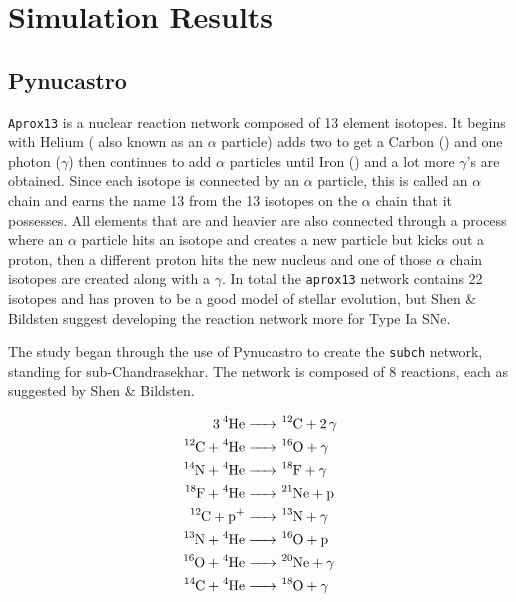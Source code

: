 \documentclass[11pt, oneside]{article}   	%
\begin{document}
\section{Simulation Results}

  \subsection{Pynucastro}
    
    {\tt Aprox13} is a nuclear reaction network composed of 13 element isotopes. It begins with Helium ( also known as an $\alpha$ particle) adds two  to get a Carbon () and one photon ($\gamma$) then continues to add $\alpha$ particles until Iron () and a lot more $\gamma$'s are obtained. Since each isotope is connected by an $\alpha$ particle, this is called an $\alpha$ chain and earns the name 13 from the 13 isotopes on the $\alpha$ chain that it possesses. All elements that are  and heavier are also connected through a process where an $\alpha$ particle hits an isotope and creates a new particle but kicks out a proton, then a different proton hits the new nucleus and one of those $\alpha$ chain isotopes are created along with a $\gamma$. In total the {\tt aprox13} network contains 22 isotopes and has proven to be a good model of stellar evolution, but Shen \& Bildsten suggest developing the reaction network more for Type Ia SNe. %
    
    The study began through the use of Pynucastro to create the {\tt subch} network, standing for sub-Chandrasekhar. The network is composed of 8 reactions, each as suggested by Shen \& Bildsten. %
    
    \begin{align}
            \ce{3 ^4He &->  ^{12}C + 2\gamma } \\ 
            \ce{^{12}C + ^4He &->  ^{16}O + \gamma } \\
            \ce{^{14}N + ^4He &->  ^{18}F + \gamma } \label{chemeq:1.1} \\
            \ce{^{18}F + ^4He &-> ^{21}Ne +  \text{p}} \label{chemeq:1.2} \\
            \ce{^{12}C + p+ &-> ^{13}N + \gamma } \label{chemeq:2.1} \\
            \ce{^{13}N + ^4He &-> ^{16}O + \text{p}} \label{chemeq:2.2} \\ 
            \ce{^{16}O + ^4He &-> ^{20}Ne + \gamma } \\
            \ce{^{14}C + ^4He &-> ^{18}O + \gamma } \label{chemeq:3.2}
    \end{align}
  
\end{document}
